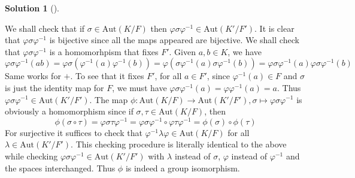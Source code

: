 \documentclass{article}
\theoremstyle{definition}
\newtheorem*{sol}{Solution}
\newenvironment{sols}[1][]{%
  \begin{sol}[#1]$ $\par\nobreak\ignorespaces
}{%
  \end{sol}
}
\begin{document}
\begin{sols}
	We shall check that if $\sigma \in \text{Aut}(K/F)$ then $\varphi \sigma \varphi^{-1} \in \text{Aut}(K'/F')$.
	It is clear that $\varphi \sigma \varphi^{-1}$ is bijective since all the maps appeared are bijective.
	We shall check that $\varphi \sigma \varphi^{-1}$ is a homomorhpism that fixes $F'$.
	Given $a, b \in K$, we have
	\[
		\varphi \sigma \varphi^{-1}(ab) = \varphi \sigma (\varphi^{-1}(a) \varphi^{-1}(b)) = \varphi (\sigma \varphi^{-1}(a) \sigma \varphi^{-1}(b)) = \varphi \sigma \varphi^{-1}(a) \varphi \sigma \varphi^{-1}(b)
	\]
	Same works for $+$.
	To see that it fixes $F'$, for all $a \in F'$, since $\varphi^{-1}(a) \in F$ and $\sigma$ is just the identity map for $F$, we must have $\varphi \sigma \varphi^{-1}(a) = \varphi \varphi^{-1} (a) = a$.
	Thus $\varphi \sigma \varphi^{-1} \in \text{Aut} (K'/F')$.
	The map $\phi: \text{Aut}(K/F) \to \text{Aut}(K'/F'), \sigma \mapsto \varphi \sigma \varphi^{-1}$ is obviously a homomorphism since if $\sigma, \tau \in \text{Aut}(K/F)$, then
	\[
		\phi(\sigma \circ \tau) = \varphi \sigma \tau \varphi^{-1} = \varphi \sigma \varphi^{-1} \circ \varphi \tau \varphi^{-1} = \phi(\sigma) \circ \phi(\tau)
	\]
	For surjective it suffices to check that $\varphi^{-1} \lambda \varphi \in \text{Aut}(K/F)$ for all $\lambda \in \text{Aut}(K'/F')$.
	This checking procedure is literally identical to the above while checking $\varphi \sigma \varphi^{-1} \in \text{Aut}(K'/F')$ with $\lambda$ instead of $\sigma$, $\varphi$ instead of $\varphi^{-1}$ and the spaces interchanged.
	Thus $\phi$ is indeed a group isomorphism.
\end{sols}
\end{document}
